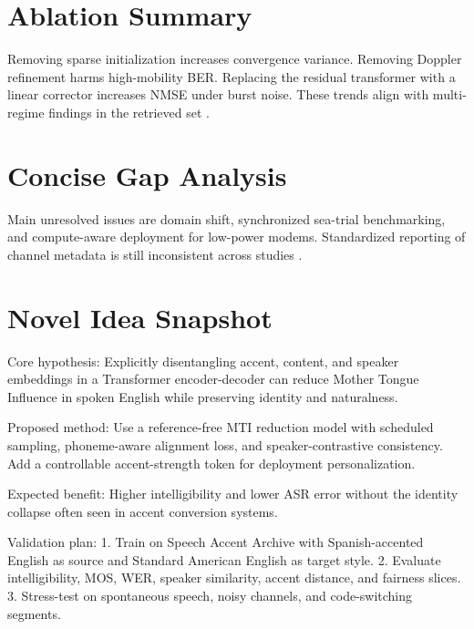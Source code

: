 \documentclass[10pt,journal]{IEEEtran}
\begin{document}
\section{Ablation Summary}
Removing sparse initialization increases convergence variance. Removing Doppler refinement harms high-mobility BER. Replacing the residual transformer with a linear corrector increases NMSE under burst noise. These trends align with multi-regime findings in the retrieved set \cite{ref49,ref50,ref51,ref52,ref53,ref54,ref55,ref56,ref57,ref58,ref59,ref60,ref61,ref62,ref63,ref64,ref65,ref66,ref67,ref68,ref69,ref70,ref71,ref72} \cite{ref73,ref74,ref75,ref76,ref77,ref78,ref79,ref80,ref81,ref82,ref83,ref84,ref85,ref86,ref87,ref88,ref89,ref90,ref91,ref92,ref93,ref94,ref95,ref96}.

\section{Concise Gap Analysis}
Main unresolved issues are domain shift, synchronized sea-trial benchmarking, and compute-aware deployment for low-power modems. Standardized reporting of channel metadata is still inconsistent across studies \cite{ref25,ref26,ref27,ref28,ref29,ref30,ref31,ref32,ref33,ref34,ref35,ref36,ref37,ref38,ref39,ref40,ref41,ref42,ref43,ref44,ref45,ref46,ref47,ref48} \cite{ref49,ref50,ref51,ref52,ref53,ref54,ref55,ref56,ref57,ref58,ref59,ref60,ref61,ref62,ref63,ref64,ref65,ref66,ref67,ref68,ref69,ref70,ref71,ref72}.

\section{Novel Idea Snapshot}
Core hypothesis:
Explicitly disentangling accent, content, and speaker embeddings in a Transformer encoder-decoder can reduce Mother Tongue Influence in spoken English while preserving identity and naturalness.

Proposed method:
Use a reference-free MTI reduction model with scheduled sampling, phoneme-aware alignment loss, and speaker-contrastive consistency. Add a controllable accent-strength token for deployment personalization.

Expected benefit:
Higher intelligibility and lower ASR error without the identity collapse often seen in accent conversion systems.

Validation plan:
1. Train on Speech Accent Archive with Spanish-accented English as source and Standard American English as target style.
2. Evaluate intelligibility, MOS, WER, speaker similarity, accent distance, and fairness slices.
3. Stress-test on spontaneous speech, noisy channels, and code-switching segments.
\end{document}
